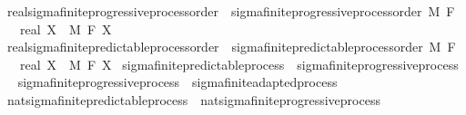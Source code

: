 \begin{isabellebody}
\isamarkupfalse%
\ real{\isacharunderscore}{\kern0pt}sigma{\isacharunderscore}{\kern0pt}finite{\isacharunderscore}{\kern0pt}progressive{\isacharunderscore}{\kern0pt}process{\isacharunderscore}{\kern0pt}order\ {\isacharequal}{\kern0pt}\ sigma{\isacharunderscore}{\kern0pt}finite{\isacharunderscore}{\kern0pt}progressive{\isacharunderscore}{\kern0pt}process{\isacharunderscore}{\kern0pt}order\ M\ F\ {\isachardoublequoteopen}{}\ {\isacharcolon}{\kern0pt}{\isacharcolon}{\kern0pt}\ real{\isachardoublequoteclose}\ X\ \ M\ F\ X\isanewline
{}\isamarkupfalse%
\ real{\isacharunderscore}{\kern0pt}sigma{\isacharunderscore}{\kern0pt}finite{\isacharunderscore}{\kern0pt}predictable{\isacharunderscore}{\kern0pt}process{\isacharunderscore}{\kern0pt}order\ {\isacharequal}{\kern0pt}\ sigma{\isacharunderscore}{\kern0pt}finite{\isacharunderscore}{\kern0pt}predictable{\isacharunderscore}{\kern0pt}process{\isacharunderscore}{\kern0pt}order\ M\ F\ {\isachardoublequoteopen}{}\ {\isacharcolon}{\kern0pt}{\isacharcolon}{\kern0pt}\ real{\isachardoublequoteclose}\ X\ \ M\ F\ X\isanewline
\isanewline
\isanewline
\isanewline
{}\isamarkupfalse%
\ sigma{\isacharunderscore}{\kern0pt}finite{\isacharunderscore}{\kern0pt}predictable{\isacharunderscore}{\kern0pt}process\ {\isasymsubseteq}\ sigma{\isacharunderscore}{\kern0pt}finite{\isacharunderscore}{\kern0pt}progressive{\isacharunderscore}{\kern0pt}process%
\isadelimproof
\ %
\endisadelimproof
%
\isatagproof
\isacommand{{\isachardot}{\kern0pt}{\isachardot}{\kern0pt}}\isamarkupfalse%
%
\endisatagproof
{\isafoldproof}%
%
\isadelimproof
%
\endisadelimproof
\isanewline
{}\isamarkupfalse%
\ sigma{\isacharunderscore}{\kern0pt}finite{\isacharunderscore}{\kern0pt}progressive{\isacharunderscore}{\kern0pt}process\ {\isasymsubseteq}\ sigma{\isacharunderscore}{\kern0pt}finite{\isacharunderscore}{\kern0pt}adapted{\isacharunderscore}{\kern0pt}process%
\isadelimproof
\ %
\endisadelimproof
%
\isatagproof
\isacommand{{\isachardot}{\kern0pt}{\isachardot}{\kern0pt}}\isamarkupfalse%
%
\endisatagproof
{\isafoldproof}%
%
\isadelimproof
%
\endisadelimproof
\ \isanewline
\isanewline
{}\isamarkupfalse%
\ nat{\isacharunderscore}{\kern0pt}sigma{\isacharunderscore}{\kern0pt}finite{\isacharunderscore}{\kern0pt}predictable{\isacharunderscore}{\kern0pt}process\ {\isasymsubseteq}\ nat{\isacharunderscore}{\kern0pt}sigma{\isacharunderscore}{\kern0pt}finite{\isacharunderscore}{\kern0pt}progressive{\isacharunderscore}{\kern0pt}process%

\end{isabellebody}
